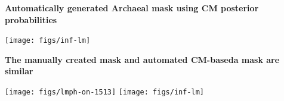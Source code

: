 \documentclass[landscape]{slides}
\begin{document}
\begin{slide}
\begin{center}
\textbf{Automatically generated Archaeal mask using CM posterior probabilities}
\end{center}
\small

\begin{center}
\texttt{[image: figs/inf-lm]}

\end{center}
\vfill
\end{slide}
\begin{slide}
\begin{center}
\textbf{The manually created mask and automated CM-baseda mask are similar}
\end{center}
\small

\begin{center}
\texttt{[image: figs/lmph-on-1513]}
\texttt{[image: figs/inf-lm]}

\end{center}
\vfill
\end{slide}
\end{document}
